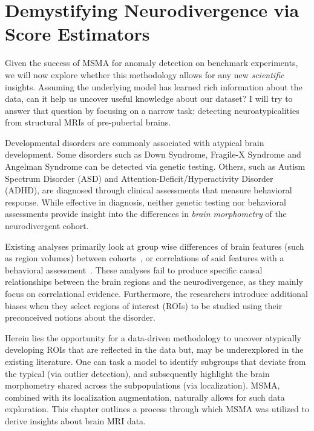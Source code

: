 \chapter{Demystifying Neurodivergence via Score Estimators }
\label{ch:demyst}

Given the success of MSMA for anomaly detection on benchmark experiments, we will now explore whether this methodology allows for any new \textit{scientific} insights.
Assuming the underlying model has learned rich information about the data, can it help us uncover useful knowledge about our dataset? I will try to answer that question by focusing on a narrow task: detecting neuroatypicalities from structural MRIs of pre-pubertal brains.


Developmental disorders are commonly associated with atypical brain development. Some disorders such as Down Syndrome, Fragile-X Syndrome and Angelman Syndrome can be detected via genetic testing. Others, such as Autism Spectrum Disorder (ASD) and Attention-Deficit/Hyperactivity Disorder (ADHD), are diagnosed through clinical assessments that measure behavioral response. While effective in diagnosis, neither genetic testing nor behavioral assessments provide insight into the differences in \textit{brain morphometry} of the neurodivergent cohort.

Existing analyses primarily look at group wise differences of brain features (such as region volumes) between cohorts~\cite{giraultNeurodevelopmentAutismInfancy2020,hamnerPediatricBrainDevelopment2018}, or correlations of said features with a behavioral assessment~\cite{shenSubcorticalBrainDevelopment2022,brainsci12040439}. These analyses fail to produce specific causal relationships between the brain regions and the neurodivergence, as they mainly focus on correlational evidence.
Furthermore, the researchers introduce additional biases when they select regions of interest (ROIs) to be studied using their preconceived notions about the disorder.

Herein lies the opportunity for a data-driven methodology to uncover atypically developing ROIs that are reflected in the data but, may be underexplored in the existing  literature. One can task a model to identify subgroups that deviate from the typical (via outlier detection), and subsequently highlight the brain morphometry shared across the subpopulations (via localization).  MSMA, combined with its localization augmentation, naturally allows for such data exploration. This chapter outlines a process through which MSMA was utilized to derive insights about brain MRI data.

